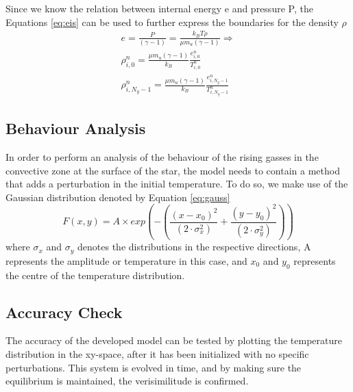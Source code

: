 \documentclass[10pt, nofootinbib, twocolumn]{revtex4-1}
\begin{document}
Since we know the relation between internal energy e and pressure P, the Equations \eqref{eq:eis} can be used to further express the boundaries for the density $\rho$
\begin{equation}
    \begin{split}
        e=\frac{P}{(\gamma-1)}=\frac{k_BT\rho}{\mu m_u(\gamma -1)} \Rightarrow \\
        \rho_{i,0}^n = \frac{\mu m_u(\gamma -1)}{k_B}\frac{e_{i,0}^n}{T_{i,0}^n} \\
        \rho_{i,N_y-1}^n = \frac{\mu m_u(\gamma -1)}{k_B}\frac{e_{i,N_y-1}^n}{T_{i,N_y-1}^n}
    \end{split}
\end{equation}

\subsection{Behaviour Analysis}
In order to perform an analysis of the behaviour of the rising gasses in the convective zone at the surface of the star, the model needs to contain a method that adds a perturbation in the initial temperature. To do so, we  make use of the Gaussian distribution denoted by Equation \eqref{eq:gauss}
\begin{equation}\label{eq:gauss}
    F(x,y) = A \times exp{\left(-\left(\frac{(x - x_0)^2}{(2 \cdot \sigma_x^2)}  + \frac{(y - y_0)^2}{(2 \cdot \sigma_y^2)}  \right) \right)}
\end{equation}
where $\sigma_x$ and $\sigma_y$ denotes the distributions in the respective directions, A represents the amplitude or temperature in this case, and $x_0$ and $y_0$ represents the centre of the temperature distribution. 

\subsection{Accuracy Check}
The accuracy of the developed model can be tested by plotting the temperature distribution in the xy-space, after it has been initialized with no specific perturbations. This system is evolved in time, and by making sure the equilibrium is maintained, the verisimilitude is confirmed. 
\end{document}
